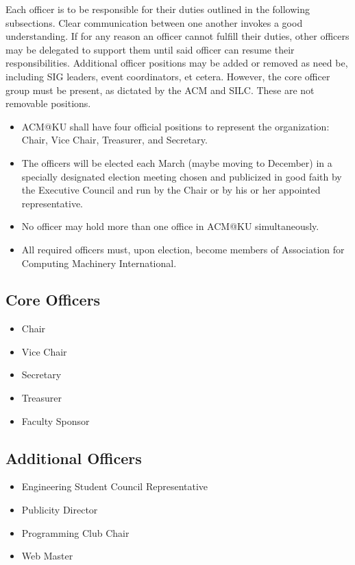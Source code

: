 Each officer is to be responsible for their duties outlined in the following
subsections. Clear communication between one another invokes a good
understanding. If for any reason an officer cannot fulfill their duties, other
officers may be delegated to support them until said officer can resume their
responsibilities. Additional officer positions may be added or removed as need
be, including SIG leaders, event coordinators, et cetera. However, the core
officer group must be present, as dictated by the ACM and SILC. These are not
removable positions.
\begin{itemize}
  \item ACM@KU shall have four official positions to represent the organization:
        Chair, Vice Chair, Treasurer, and Secretary.
  \item The officers will be elected each March (maybe moving to December) in a
        specially designated election meeting chosen and publicized in good
        faith by the Executive Council and run by the Chair or by his or her
        appointed representative.
  \item No officer may hold more than one office in ACM@KU simultaneously.
  \item All required officers must, upon election, become members of Association
        for Computing Machinery International.
\end{itemize}

\subsection{Core Officers}
\label{subsec:subsec01}

\begin{itemize}
  \item Chair
  \item Vice Chair
  \item Secretary
  \item Treasurer
  \item Faculty Sponsor
\end{itemize}

\subsection{Additional Officers}
\label{subsec:subsec02}

\begin{itemize}
  \item Engineering Student Council Representative
  \item Publicity Director
  \item Programming Club Chair
  \item Web Master
\end{itemize}

